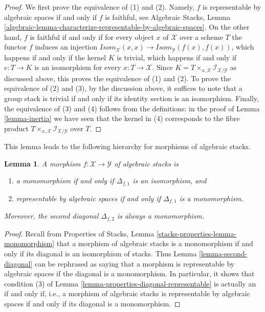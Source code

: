 \documentclass{stacks-project}
\theoremstyle{plain}
\newtheorem{lemma}[subsection]{Lemma}
\theoremstyle{definition}
\theoremstyle{remark}
\numberwithin{equation}{subsection}
\begin{document}
\begin{proof}
We first prove the equivalence of (1) and (2).
Namely, $f$ is representable by algebraic spaces if and only if $f$ is
faithful, see
Algebraic Stacks,
Lemma \ref{algebraic-lemma-characterize-representable-by-algebraic-spaces}.
On the other hand, $f$ is faithful if and only if for every object $x$
of $\mathcal{X}$ over a scheme $T$ the functor $f$ induces an injection
$\mathit{Isom}_\mathcal{X}(x, x) \to
\mathit{Isom}_\mathcal{Y}(f(x), f(x))$,
which happens if and only if the kernel $K$ is trivial, which happens if and
only if $e : T \to K$ is an isomorphism for every $x : T \to \mathcal{X}$.
Since $K = T \times_{x, \mathcal{X}} \mathcal{I}_{\mathcal{X}/\mathcal{Y}}$
as discussed above, this proves the equivalence of (1) and (2). To prove
the equivalence of (2) and (3), by the discussion above, it suffices to
note that a group stack is trivial if and only if its identity section
is an isomorphism. Finally, the equivalence of (3) and (4) follows
from the definitions: in the proof of Lemma \ref{lemma-inertia}
we have seen that the kernel in (4) corresponds to the fibre product
$T \times_{x, \mathcal{X}} \mathcal{I}_{\mathcal{X}/\mathcal{Y}}$ over $T$.
\end{proof}

\noindent
This lemma leads to the following hierarchy for
morphisms of algebraic stacks.

\begin{lemma}
\label{lemma-hierarchy}
A morphism $f : \mathcal{X} \to \mathcal{Y}$ of algebraic stacks is
\begin{enumerate}
\item a monomorphism if and only if $\Delta_{f, 1}$ is an isomorphism, and
\item representable by algebraic spaces if and only if $\Delta_{f, 1}$
is a monomorphism.
\end{enumerate}
Moreover, the second diagonal $\Delta_{f, 2}$ is always a monomorphism.
\end{lemma}

\begin{proof}
Recall from Properties of Stacks, Lemma
\ref{stacks-properties-lemma-monomorphism}
that a morphism of algebraic stacks is a monomorphism
if and only if its diagonal is an isomorphism of stacks.
Thus Lemma \ref{lemma-second-diagonal}
can be rephrased as saying that a morphism is
representable by algebraic spaces if the diagonal
is a monomorphism. In particular, it shows that condition
(3) of Lemma \ref{lemma-properties-diagonal-representable}
is actually an if and only if, i.e., a morphism of algebraic stacks
is representable by algebraic spaces if and only if
its diagonal is a monomorphism.
\end{proof}
\end{document}
